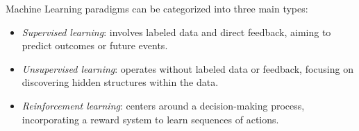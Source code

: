 Machine Learning paradigms can be categorized into three main types:
\begin{itemize}
    \item \textit{Supervised learning}: involves labeled data and direct feedback, aiming to predict outcomes or future events.
    \item \textit{Unsupervised learning}: operates without labeled data or feedback, focusing on discovering hidden structures within the data.
    \item \textit{Reinforcement learning}: centers around a decision-making process, incorporating a reward system to learn sequences of actions.
\end{itemize}